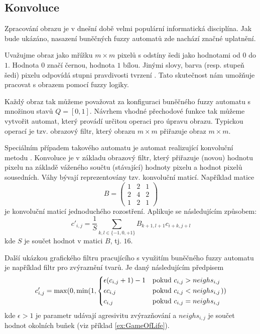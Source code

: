 \documentclass[a4paper,10pt]{article}
\begin{document}
\subsection{Konvoluce}
Zpracování obrazu je v dnešní době velmi populární informatická disciplína. Jak bude ukázáno, nasazení buněčných fuzzy automatů zde nachází značné uplatnění.

Uvažujme obraz jako mřížku $m \times m$ pixelů s odstíny šedi jako hodnotami od $0$ do $1$. Hodnota $0$ značí černou, hodnota $1$ bílou. Jinými slovy, barva (resp. stupeň šedi) pixelu odpovídá stupni pravdivosti tvrzení . Tato skutečnost nám umožňuje pracovat s obrazem pomocí fuzzy logiky.

Každý obraz tak můžeme považovat za konfiguraci buněčného fuzzy automatu s množinou stavů $Q = [0,1]$. Návrhem vhodné přechodové funkce tak můžeme vytvořit automat, který provádí určitou operaci pro úpravu obrazu. Typickou operací je tzv. obrazový filtr, který obrazu $m \times m$ přiřazuje obraz $m \times m$.

Speciálním případem takového automatu je automat realizující konvoluční metodu \cite{Rus-ImaProHan}. Konvoluce je v základu obrazový filtr, který přiřazuje (novou) hodnotu pixelu na základě váženého součtu (stávající) hodnoty pixelu a hodnot pixelů sousedních. Váhy bývají reprezentovány tzv. konvoluční maticí. Například matice
$$
  B = \begin{pmatrix}
       1 & 2 & 1 \\
       2 & 4 & 2 \\
       1 & 2 & 1 
      \end{pmatrix}
$$
je konvoluční maticí jednoduchého rozostření. Aplikuje se následujícím způsobem:
$$
  c'_{i,j} = \frac{1}{S} \sum_{k,l \in \{-1, 0, +1\}} B_{k+1, l+1} c_{i+k, j+l}
$$
kde $S$ je součet hodnot v matici $B$, tj. $16$.

Další ukázkou grafického filtru pracujícího s využitím buněčného fuzzy automatu je například filtr pro zvýraznění tvarů. Je daný následujícím předpisem
$$
  c'_{i,j} = \max(0, \min(1, 
    \begin{dcases}
      \epsilon (c_{i,j} + 1) - 1	& \text{pokud $c_{i,j} > neighs_{i,j}$} \\
      \epsilon c_{i,j}			& \text{pokud $c_{i,j} < neighs_{i,j}$} \\
      c_{i,j}	& \text{pokud $c_{i,j} = neighs_{i,j}$} 
    \end{dcases}
    ))
$$
kde $\epsilon > 1$ je parametr udávají agresivitu zvýrazňování a $neighs_{i,j}$ je součet hodnot okolních buňek (viz příklad \ref{ex:GameOfLife}).
\end{document}
